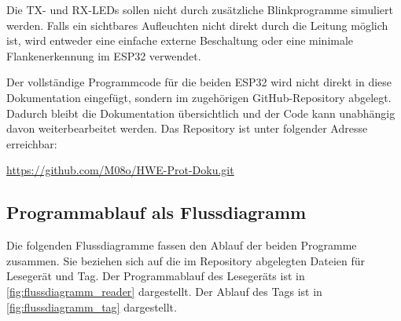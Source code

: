 Die TX- und RX-LEDs sollen nicht durch zusätzliche Blinkprogramme simuliert werden. Falls ein sichtbares Aufleuchten nicht direkt durch die Leitung möglich ist, wird entweder eine einfache externe Beschaltung oder eine minimale Flankenerkennung im ESP32 verwendet.

Der vollständige Programmcode für die beiden ESP32 wird nicht direkt in diese Dokumentation eingefügt, sondern im zugehörigen GitHub-Repository abgelegt. Dadurch bleibt die Dokumentation übersichtlich und der Code kann unabhängig davon weiterbearbeitet werden. Das Repository ist unter folgender Adresse erreichbar:
\begin{center}
  \url{https://github.com/M08o/HWE-Prot-Doku.git}
\end{center}

\subsection{Programmablauf als Flussdiagramm}
Die folgenden Flussdiagramme fassen den Ablauf der beiden Programme zusammen. Sie beziehen sich auf die im Repository abgelegten Dateien für Lesegerät und Tag.
Der Programmablauf des Lesegeräts ist in \cref{fig:flussdiagramm_reader} dargestellt. Der Ablauf des Tags ist in \cref{fig:flussdiagramm_tag} dargestellt.


